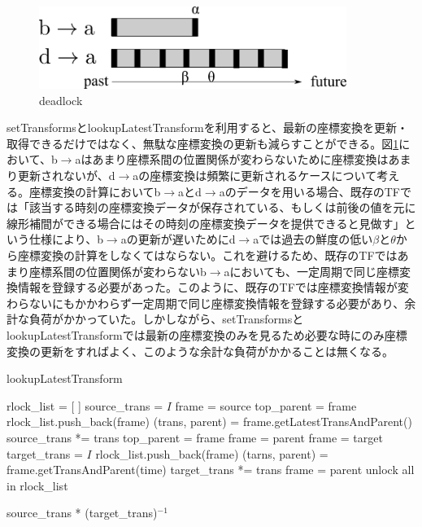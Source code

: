 \documentclass[a4paper]{jreport}	%
\begin{document}
\begin{figure}[h] 
\centering
\includegraphics[width=10cm]{need-many-update}
\caption{deadlock}
\label{fig:need-many-update}
\end{figure}


setTransformsとlookupLatestTransformを利用すると、最新の座標変換を更新・取得できるだけではなく、無駄な座標変換の更新も減らすことができる。図\ref{fig:need-many-update}において、b$\rightarrow$aはあまり座標系間の位置関係が変わらないために座標変換はあまり更新されないが、d$\rightarrow$aの座標変換は頻繁に更新されるケースについて考える。座標変換の計算においてb$\rightarrow$aとd$\rightarrow$aのデータを用いる場合、既存のTFでは「該当する時刻の座標変換データが保存されている、もしくは前後の値を元に線形補間ができる場合にはその時刻の座標変換データを提供できると見做す」という仕様により、b$\rightarrow$aの更新が遅いためにd$\rightarrow$aでは過去の鮮度の低い$\beta$と$\theta$から座標変換の計算をしなくてはならない。これを避けるため、既存のTFではあまり座標系間の位置関係が変わらないb$\rightarrow$aにおいても、一定周期で同じ座標変換情報を登録する必要があった。このように、既存のTFでは座標変換情報が変わらないにもかかわらず一定周期で同じ座標変換情報を登録する必要があり、余計な負荷がかかっていた。しかしながら、setTransformsと
lookupLatestTransformでは最新の座標変換のみを見るため必要な時にのみ座標変換の更新をすればよく、このような余計な負荷がかかることは無くなる。


\begin{algorithm}
  \caption{lookupLatestTransform}\label{euclid}
\begin{algorithmic}[1]
	\State rlock\_list = [ ]
	\State source\_trans = $I$
	\State frame = source
	\State top\_parent = frame
	\State rlock\_list.push\_back(frame)
	\State (trans, parent) = frame.getLatestTransAndParent() 
	\State source\_trans *= trans
	\State top\_parent = frame
	\State frame = parent
	\EndWhile
	\State frame = target
	\State target\_trans = $I$
	\State rlock\_list.push\_back(frame)
	\State (tarns, parent) = frame.getTransAndParent(time)
	\State target\_trans *= trans
	\State frame = parent
	\EndWhile
	\State unlock all in rlock\_list
	
	\Return source\_trans * (target\_trans)$^{-1}$
	\EndFunction
\end{algorithmic}
\end{algorithm}
\end{document}
